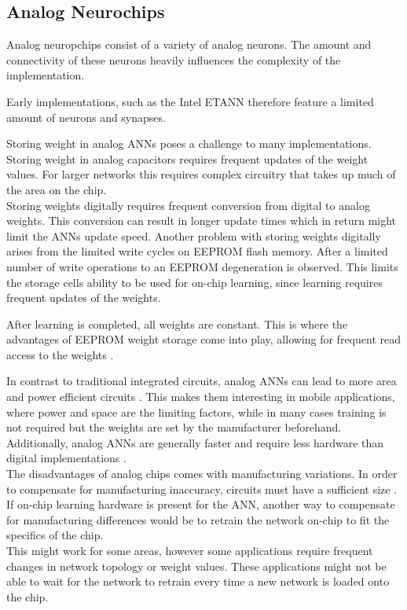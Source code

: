 \documentclass[conference]{IEEEtran}
\begin{document}


    \subsection{Analog Neurochips}

    Analog neuropchips consist of a variety of analog neurons.
    The amount and connectivity of these neurons heavily influences the complexity of the implementation.

    Early implementations, such as the Intel ETANN therefore feature a limited amount of neurons and synapses.

    Storing weight in analog ANNs poses a challenge to many implementations.
    Storing weight in analog capacitors requires frequent updates of the weight values.
    For larger networks this requires complex circuitry that takes up much of the area on the chip.
    \\
    Storing weights digitally requires frequent conversion from digital to analog weights.
    This conversion can result in longer update times which in return might limit the ANNs update speed.
    Another problem with storing weights digitally arises from the limited write cycles on EEPROM flash memory.
    After a limited number of write operations to an EEPROM degeneration is observed.
    This limits the storage cells ability to be used for on-chip learning, since learning requires frequent updates of the weights.

    After learning is completed, all weights are constant.
    This is where the advantages of EEPROM weight storage come into play, allowing for frequent read access to the weights \cite{holler1989electrically}.


    In contrast to traditional integrated circuits, analog ANNs can lead to more area and power efficient circuits \cite{forssell2014hardware}.
    This makes them interesting in mobile applications, where power and space are the limiting factors, while in many cases training is not required but the weights are set by the manufacturer beforehand.
    Additionally, analog ANNs are generally faster and require less hardware than digital implementations \cite{hollis1990artificial}.\\

    The disadvantages of analog chips comes with manufacturing variations.
    In order to compensate for manufacturing inaccuracy, circuits must have a sufficient size \cite{forssell2014hardware}.
    If on-chip learning hardware is present for the ANN, another way to compensate for manufacturing differences would be to retrain the network on-chip to fit the specifics of the chip.\\
    This might work for some areas, however some applications require frequent changes in network topology or weight values.
    These applications might not be able to wait for the network to retrain every time a new network is loaded onto the chip.
\end{document}
